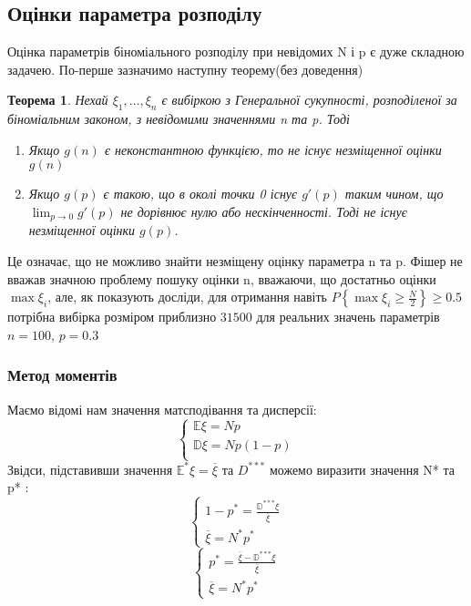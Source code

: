 \documentclass{article}
\newtheorem{theorem}{Теорема}
\begin{document}
\subsection{Оцінки параметра розподілу}
Оцінка параметрів біноміального розподілу при невідомих N і p є дуже складною задачею.
По-перше зазначимо наступну теорему(без доведення)
\begin{theorem}
    Нехай $\xi_1, \dots, \xi_n$ є вибіркою з Генеральної сукупності, розподіленої за біноміальним
    законом, з невідомими значеннями n та p. Тоді
    \begin{enumerate}
        \item Якщо $g(n)$ є неконстантною функцією, то не існує незміщенної оцінки $g(n)$ 
        \item Якщо $g(p)$ є такою, що в околі точки 0 існує $g'(p)$ таким чином, що
            $\lim_{p\rightarrow 0} g'(p)$ не дорівнює нулю або нескінченності. Тоді не існує
            незміщенної оцінки $g(p)$.
    \end{enumerate}
\end{theorem}
Це означає, що не можливо знайти незміщену оцінку параметра n та p.
Фішер не вважав значною проблему пошуку оцінки n, вважаючи, що достатньо оцінки $\max\xi_i$, але,
як показують досліди, для отримання навіть $P\left\{\max\xi_i \geq \frac{N}{2}\right\}\geq 0.5$
потрібна вибірка розміром приблизно $31 500$ для реальних значень параметрів $n=100$, $p=0.3$ 

\subsubsection{Метод моментів}
Маємо відомі нам значення матсподівання та дисперсії:
$$
\begin{cases}
    \mathbb{E}\xi=Np \\
    \mathbb{D}\xi=Np(1-p)\\
\end{cases}
$$
Звідси, підставивши значення $\mathbb{E}^*\xi = \overline{\xi}$ та $D^{***}$ можемо виразити
значення N* та p* :
$$
\begin{cases}
    1-p^* = \frac{\mathbb{D}^{***}\xi}{\overline{\xi}}\\
    \overline{\xi} = N^*p^*
\end{cases}
$$
$$
\begin{cases}
    p^* = \frac{\overline{\xi} - \mathbb{D}^{***}\xi}{\overline{\xi}}\\
    \overline{\xi} = N^*p^*
\end{cases}
$$
\end{document}
